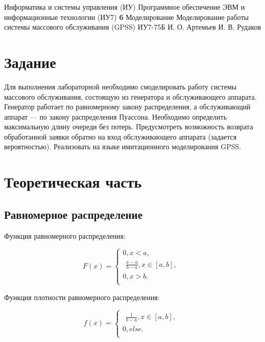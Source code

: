\documentclass{bmstu}
\begin{document}
\makereporttitle
{Информатика и системы управления (ИУ)}
{Программное обеспечение ЭВМ и информационные технологии (ИУ7)}
{\textbf{6}}
{Моделирование}
{Моделирование работы системы массового обслуживания (GPSS)}
{}
{ИУ7-75Б}
{И. О. Артемьев}
{И. В. Рудаков}


\setcounter{page}{2}
\renewcommand{\contentsname}{Содержание} 
\tableofcontents

\chapter{Задание}

Для выполнения лабораторной необходимо смоделировать работу 
системы массового обслуживания, состоящую из генератора и 
обслуживающего аппарата. Генератор работает по равномерному 
закону распределения, а обслуживающий аппарат --- по закону распределения 
Пуассона. 
Необходимо определить максимальную длину очереди без потерь. 
Предусмотреть возможность возврата обработанной заявки обратно 
на вход обслуживающего аппарата (задается вероятностью). 
Реализовать на языке имитационного моделирования GPSS.

\chapter{Теоретическая часть}

\section{Равномерное распределение}

Функция равномерного распределения:

\begin{equation}
    F(x) =
    \begin{cases}
            0, x < a, \\
            \begin{aligned}
                \frac{x -  a}{b - a}, x \in [a, b], 
            \end{aligned}\\
            0, x > b. \\
    \end{cases}
\end{equation}

Функция плотности равномерного распределения:

\begin{equation}
    f(x) =
    \begin{cases}
            \begin{aligned}
                \frac{1}{b - a}, x \in [a, b], 
            \end{aligned}\\
            0, else. \\
    \end{cases}
\end{equation}
\end{document}
